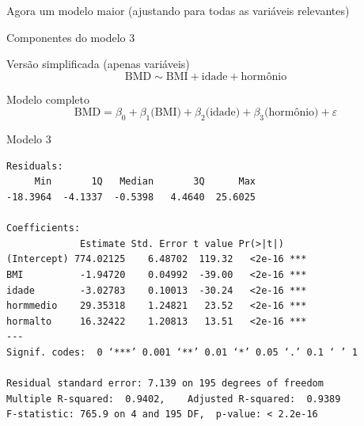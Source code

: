 \documentclass{beamer}
\begin{document}
\begin{frame}
  \begin{center}
    Agora um modelo maior (ajustando para todas as variáveis relevantes)
  \end{center}
\end{frame}

\begin{frame}{\small Componentes do modelo 3}
  \begin{block}{\footnotesize Versão simplificada (apenas variáveis)}
    \footnotesize
    \begin{displaymath}
      \text{BMD} \sim \text{BMI} + \text{idade} + \text{hormônio}
    \end{displaymath}
  \end{block}
  \bigskip
  \bigskip
  \begin{block}{Modelo completo}
    \begin{displaymath}
      \text{BMD} =\beta_0 + \beta_1 \text{(BMI)} + \beta_2 \text{(idade)} + \beta_3 \text{(hormônio)} +\varepsilon
    \end{displaymath}
  \end{block}
  \vfill
\end{frame}

\begin{frame}[fragile]{}
  \begin{center}
    \begin{exampleblock}{Modelo 3}
      \tiny
\begin{verbatim}
Residuals:
     Min       1Q   Median       3Q      Max 
-18.3964  -4.1337  -0.5398   4.4640  25.6025 

Coefficients:
             Estimate Std. Error t value Pr(>|t|)    
(Intercept) 774.02125    6.48702  119.32   <2e-16 ***
BMI          -1.94720    0.04992  -39.00   <2e-16 ***
idade        -3.02783    0.10013  -30.24   <2e-16 ***
hormmedio    29.35318    1.24821   23.52   <2e-16 ***
hormalto     16.32422    1.20813   13.51   <2e-16 ***
---
Signif. codes:  0 ‘***’ 0.001 ‘**’ 0.01 ‘*’ 0.05 ‘.’ 0.1 ‘ ’ 1

Residual standard error: 7.139 on 195 degrees of freedom
Multiple R-squared:  0.9402,	Adjusted R-squared:  0.9389 
F-statistic: 765.9 on 4 and 195 DF,  p-value: < 2.2e-16
\end{verbatim}
    \end{exampleblock}
  \end{center}
\end{frame}
\end{document}
